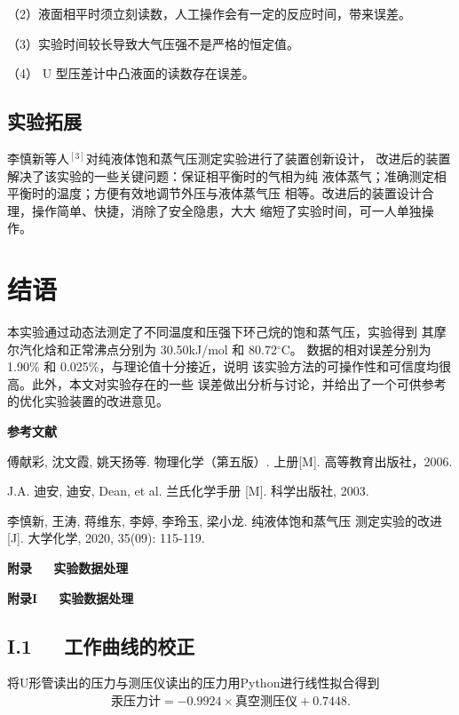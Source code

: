 \documentclass[12pt]{ctexart}
\numberwithin{equation}{section}
\begin{document}
（2）液面相平时须立刻读数，人工操作会有一定的反应时间，带来误差。

（3）实验时间较长导致大气压强不是严格的恒定值。

（4） U 型压差计中凸液面的读数存在误差。

\subsection{实验拓展}
李慎新等人$^{[3]}$对纯液体饱和蒸气压测定实验进行了装置创新设计，
改进后的装置解决了该实验的一些关键问题：保证相平衡时的气相为纯
液体蒸气；准确测定相平衡时的温度；方便有效地调节外压与液体蒸气压
相等。改进后的装置设计合理，操作简单、快捷，消除了安全隐患，大大
缩短了实验时间，可一人单独操作。

\section{结语}
本实验通过动态法测定了不同温度和压强下环己烷的饱和蒸气压，实验得到
其摩尔汽化焓和正常沸点分别为 30.50kJ/mol 和 80.72$^\circ$C。
数据的相对误差分别为 1.90\% 和 0.025\%，与理论值十分接近，说明
该实验方法的可操作性和可信度均很高。此外，本文对实验存在的一些
误差做出分析与讨论，并给出了一个可供参考的优化实验装置的改进意见。

\begin{center}
    \Large\bfseries{参考文献}
\end{center}
\noindent
[1] 傅献彩, 沈文霞, 姚天扬等. 物理化学（第五版）. 上册[M].
高等教育出版社，2006.

\noindent
[2] J.A. 迪安, 迪安, Dean, et al. 兰氏化学手册 [M]. 科学出版社,
2003.

\noindent
[3] 李慎新, 王涛, 蒋维东, 李婷, 李玲玉, 梁小龙. 纯液体饱和蒸气压
测定实验的改进[J]. 大学化学, 2020, 35(09): 115-119.

\newpage

\begin{center}
    \LARGE\bfseries{附录~~~实验数据处理}
\end{center}
\begin{center}
    \Large\bfseries{附录I~~~实验数据处理}
\end{center}

\subsection*{I.1~~~工作曲线的校正}

将U形管读出的压力与测压仪读出的压力用Python进行线性拟合得到
\begin{align}
    \text{汞压力计} = -0.9924 \times \text{真空测压仪} + 0.7448.
    \tag*{(I.1)}
\end{align}
\end{document}
